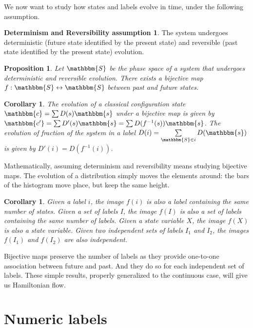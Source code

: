 \documentclass[aps,pra,10pt,twocolumn,floatfix,nofootinbib]{revtex4-1}
\newtheorem{cor}[thm]{Corollary}
\newtheorem{prop}[thm]{Proposition}
\theoremstyle{definition}
\newtheorem*{assump2}{Determinism and Reversibility assumption}
\begin{document}
We now want to study how states and labels evolve in time, under the following assumption.

\begin{assump2}
The system undergoes deterministic (future state identified by the present state) and reversible (past state identified by the present state) evolution.
\end{assump2}

\begin{prop}\label{detrevMap}
Let $\mathbbm{S}$ be the phase space of a system that undergoes deterministic and reversible evolution. There exists a bijective map $f:\mathbbm{S} \leftrightarrow \mathbbm{S}$ between past and future states.
\end{prop}

\begin{cor}\label{detrevDist}
The evolution of a classical configuration state $\mathbbm{c}=\sum D(s) \mathbbm{s}$ under a bijective map is given by $\mathbbm{c'}=\sum D'(s) \mathbbm{s}=\sum D(f^{-1}(s)) \mathbbm{s}$. The evolution of fraction of the system in a label $D(i)=\sum\limits_{\mathbbm{S} \in i} D(\mathbbm{s})$ is given by $D'(i)=D(f^{-1}(i))$.
\end{cor}

Mathematically, assuming determinism and reversibility means studying bijective maps. The evolution of a distribution simply moves the elements around: the bars of the histogram move place, but keep the same height.

\begin{cor}\label{labelsCount}
Given a label $i$, the image $f(i)$ is also a label containing the same number of states. Given a set of labels $I$, the image $f(I)$ is also a set of labels containing the same number of labels. Given a state variable $X$, the image $f(X)$ is also a state variable. Given two independent sets of labels $I_1$ and $I_2$, the images $f(I_1)$ and $f(I_2)$ are also independent.
\end{cor}

Bijective maps preserve the number of labels as they provide one-to-one association between future and past. And they do so for each independent set of labels. These simple results, properly generalized to the continuous case, will give us Hamiltonian flow.

\section{Numeric labels}
\end{document}
